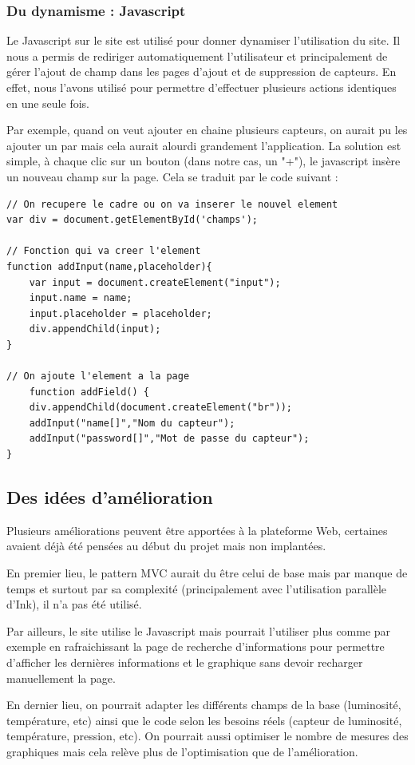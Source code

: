 	\subsubsection{Du dynamisme : Javascript} 
	\par
	Le Javascript sur le site est utilisé pour donner dynamiser l'utilisation du site. Il nous a permis de rediriger automatiquement l'utilisateur et principalement de gérer l'ajout de champ dans les pages d'ajout et de suppression de capteurs.
	En effet, nous l'avons utilisé pour permettre d'effectuer plusieurs actions identiques en une seule fois.
	\par
	Par exemple, quand on veut ajouter en chaine plusieurs capteurs, on aurait pu les ajouter un par mais cela aurait alourdi grandement l'application. La solution est simple, à chaque clic sur un bouton (dans notre cas, un "+"), le javascript insère un nouveau champ sur la page. 
	Cela se traduit par le code suivant : 
	\\%
	\lstset{language=Java} 
	\begin{lstlisting}[frame=single]
// On recupere le cadre ou on va inserer le nouvel element
var div = document.getElementById('champs');

// Fonction qui va creer l'element
function addInput(name,placeholder){
	var input = document.createElement("input");
	input.name = name;
	input.placeholder = placeholder; 
	div.appendChild(input);
}

// On ajoute l'element a la page
	function addField() {
	div.appendChild(document.createElement("br"));
	addInput("name[]","Nom du capteur");
	addInput("password[]","Mot de passe du capteur");
}	
	\end{lstlisting}
	\subsection{Des idées d'amélioration}
	\par
	Plusieurs améliorations peuvent être apportées à la plateforme Web, certaines avaient déjà été pensées au début du projet mais non implantées.
	\par
	En premier lieu, le pattern MVC aurait du être celui de base mais par manque de temps et surtout par sa complexité (principalement avec l'utilisation parallèle d'Ink), il n'a pas été utilisé.
	\par
	Par ailleurs, le site utilise le Javascript mais pourrait l'utiliser plus comme par exemple en rafraichissant la page de recherche d'informations pour permettre d'afficher les dernières informations et le graphique sans devoir recharger manuellement la page.
	\par
	En dernier lieu, on pourrait adapter les différents champs de la base (luminosité, température, etc) ainsi que le code selon les besoins réels (capteur de luminosité, température, pression, etc). On pourrait aussi optimiser le nombre de mesures des graphiques mais cela relève plus de l'optimisation que de l'amélioration.